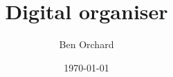 \newcommand{\addmylib}[1]{}
\newcommand{\addsrc}[1]{}

\addmylib{preamble}
\addmylib{annotate}
\addmylib{extra/tables}
\addmylib{extra/headers-footers}
\addmylib{custom/boxref}



\title{Digital organiser}
\author{Ben Orchard}

\date{\today}

\maketitle

\clearpage
\tableofcontents
\clearpage

\addsrc{analysis}
\clearpage
\addsrc{design}


